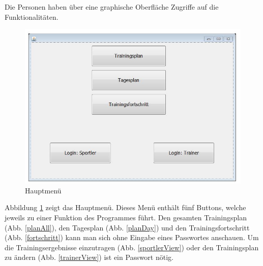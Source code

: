 \documentclass[a4paper,12pt]{article}
\begin{document}
Die Personen haben über eine graphische Oberfläche Zugriffe auf die Funktionalitäten.


\begin{figure}[H]
\begin{center}
 \includegraphics[width=0.75\hsize]{./menu.jpg}
 \end{center}
\caption[Hauptmenü]{\label{haupt}Hauptmenü}
\end{figure}

Abbildung \ref{haupt} zeigt das Hauptmenü. Dieses Menü enthält fünf Buttons, welche jeweils zu einer Funktion des Programmes führt. Den gesamten Trainingsplan (Abb. \ref{planAll}), den Tagesplan (Abb. \ref{planDay}) und den Trainingsfortschritt (Abb. \ref{fortschritt}) kann man sich ohne Eingabe eines Passwortes anschauen. Um die Trainingsergebnisse einzutragen (Abb. \ref{sportlerView}) oder den Trainingsplan zu ändern (Abb. \ref{trainerView}) ist ein Passwort nötig.
\end{document}
